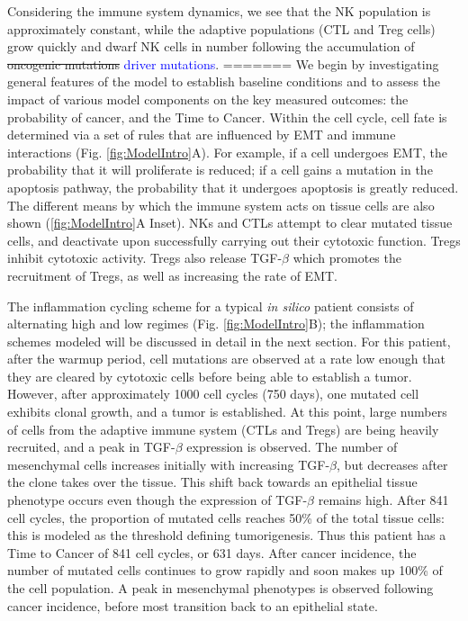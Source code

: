 \documentclass[11pt]{article}
\newcommand{\tcb} { \textcolor{blue} }
\begin{document}
\par 
Considering the immune system dynamics, we see that the NK population is approximately constant, while the adaptive populations (CTL and Treg cells) grow quickly and dwarf NK cells in number following the accumulation of \sout{oncogenic mutations} \tcb{driver mutations}.
=======
We begin by investigating general features of the model to establish baseline conditions and to assess the impact of various model components on the key measured outcomes: the probability of cancer, and the Time to Cancer. 
Within the cell cycle, cell fate is determined via a set of rules that are influenced by EMT and immune interactions (Fig. \ref{fig:ModelIntro}A). For example, if a cell undergoes EMT, the probability that it will proliferate is reduced; if a cell gains a mutation in the apoptosis pathway, the probability that it undergoes apoptosis is greatly reduced. The different means by which the immune system acts on tissue cells are also shown (\ref{fig:ModelIntro}A Inset). NKs and CTLs attempt to clear mutated tissue cells, and deactivate upon successfully carrying out their cytotoxic function. Tregs inhibit cytotoxic activity. Tregs also release TGF-$\beta$ which promotes the recruitment of Tregs, as well as increasing the rate of EMT.
\par
The inflammation cycling scheme for a typical {\it in silico} patient consists of alternating high and low regimes (Fig. \ref{fig:ModelIntro}B); the inflammation schemes modeled will be discussed in detail in the next section. For this patient, after the warmup period, cell mutations are observed at a rate low enough that they are cleared by cytotoxic cells before being able to establish a tumor. However, after approximately 1000 cell cycles (750 days), one mutated cell exhibits clonal growth, and a tumor is established. At this point, large numbers of cells from the adaptive immune system (CTLs and Tregs) are being heavily recruited, and a peak in TGF-$\beta$ expression is observed. The number of mesenchymal cells increases initially with increasing TGF-$\beta$, but decreases after the clone takes over the tissue. This shift back towards an epithelial tissue phenotype occurs even though the expression of TGF-$\beta$ remains high.
After 841 cell cycles, the proportion of mutated cells reaches 50\% of the total tissue cells: this is modeled as the threshold defining tumorigenesis. Thus this patient has a Time to Cancer of 841 cell cycles, or 631 days. 
After cancer incidence, the number of mutated cells continues to grow rapidly and soon makes up 100\% of the cell population. A peak in mesenchymal phenotypes is observed following cancer incidence, before most transition back to an epithelial state.
\end{document}
